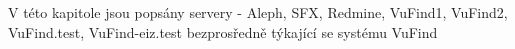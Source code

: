 \label{sec:hwntk}
V této kapitole jsou popsány servery - Aleph, SFX, Redmine, VuFind1, VuFind2, VuFind.test, VuFind-eiz.test
bezprosředně týkající se systému VuFind